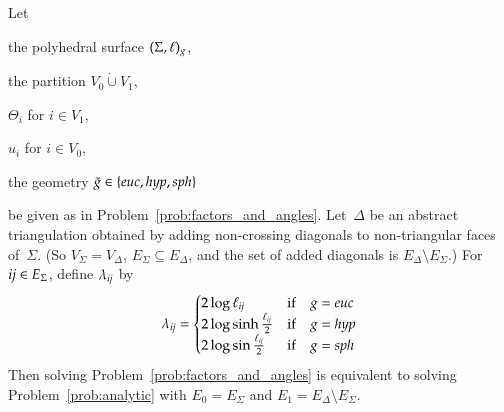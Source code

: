 \documentclass[Thesis]{subfiles}
\begin{document}
\begin{lemma}
  \label{lem:analytic}
  Let 
  \begin{compactitem}[$\bullet$]
  \item the polyhedral surface\/ $(\Sigma,\ell)_{g}$,
  \item the partition $V_{0}\dot\cup V_{1}$,
  \item $\Theta_{i}$ for $i\in V_{1}$,
  \item $u_{i}$ for $i\in V_{0}$,
  \item the geometry $\gt\in\{\euc,\hyp,\sph\}$
  \end{compactitem}
  be given as in Problem~\ref{prob:factors_and_angles}. Let~$\Delta$
  be an abstract triangulation obtained by adding non-crossing
  diagonals to non-triangular faces of\/~$\Sigma$. (So
  $V_{\Sigma}=V_{\Delta}$, $E_{\Sigma}\subseteq E_{\Delta}$, and the
  set of added diagonals is $E_{\Delta}\setminus E_{\Sigma}$.) For
  ${\it ij}\in E_{\Sigma}$, define $\lambda_{\it ij}$ by
  \begin{equation}
    \label{eq:lambda}
    \lambda_{\it ij}=
    \begin{cases}
      2\log\ell_{\it ij} & \text{if}\quad \g=\euc\\
      2\log\sinh\frac{\ell_{\it ij}}{2} & \text{if}\quad \g=\hyp\\
      2\log\sin\frac{\ell_{\it ij}}{2} & \text{if}\quad \g=\sph
    \end{cases}
  \end{equation}
  Then solving Problem~\ref{prob:factors_and_angles} is equivalent to
  solving Problem~\ref{prob:analytic} with $E_{0}=E_{\Sigma}$ and
  $E_{1}=E_{\Delta}\setminus E_{\Sigma}$.
\end{lemma}
\goodbreak
\end{document}
